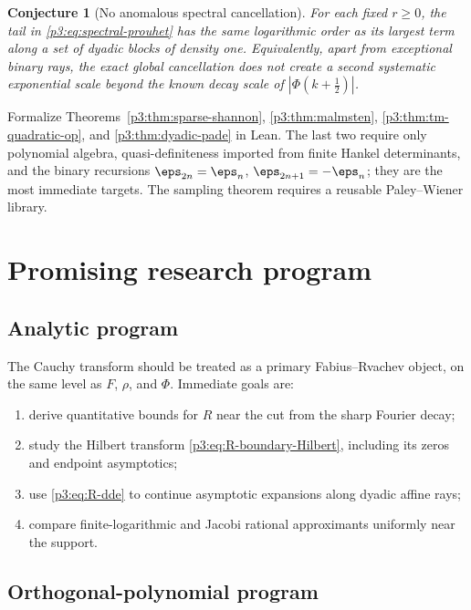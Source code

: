 \documentclass[11pt,oneside]{article}
\newtheorem{conjecture}[theorem]{Conjecture}
\theoremstyle{definition}
\begin{document}
\begin{conjecture}[No anomalous spectral cancellation]
\label{p3:conj:no-anomalous-cancellation}
For each fixed \(r\ge0\), the tail in \eqref{p3:eq:spectral-prouhet} has the same logarithmic
order as its largest term along a set of dyadic blocks of density one.  Equivalently, apart
from exceptional binary rays, the exact global cancellation does not create a second
systematic exponential scale beyond the known decay scale of
\(|\Phi(k+\tfrac12)|\).
\end{conjecture}

\begin{problem}
Formalize Theorems~\ref{p3:thm:sparse-shannon}, \ref{p3:thm:malmsten},
\ref{p3:thm:tm-quadratic-op}, and \ref{p3:thm:dyadic-pade} in Lean.  The last two require only
polynomial algebra, quasi-definiteness imported from finite Hankel determinants, and the
binary recursions \(\eps_{2n}=\eps_n\), \(\eps_{2n+1}=-\eps_n\); they are the most
immediate targets.  The sampling theorem requires a reusable Paley--Wiener library.
\end{problem}

\section{Promising research program}

\subsection{Analytic program}

The Cauchy transform should be treated as a primary Fabius--Rvachev object, on the same
level as \(F\), \(\rho\), and \(\Phi\).  Immediate goals are:

\begin{enumerate}
\item derive quantitative bounds for \(R\) near the cut from the sharp Fourier decay;
\item study the Hilbert transform \eqref{p3:eq:R-boundary-Hilbert}, including its zeros and
      endpoint asymptotics;
\item use \eqref{p3:eq:R-dde} to continue asymptotic expansions along dyadic affine rays;
\item compare finite-logarithmic and Jacobi rational approximants uniformly near the
      support.
\end{enumerate}

\subsection{Orthogonal-polynomial program}
\end{document}
